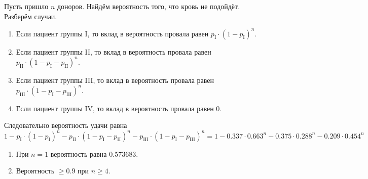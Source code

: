 \documentclass[12pt,a4paper]{article}
\begin{document}
    \begin{problem}{10}
        Пусть пришло $n$ доноров. Найдём вероятность того, что кровь не подойдёт. Разберём случаи.
        \begin{enumerate}
            \item Если пациент группы I, то вклад в вероятность провала равен $p_\mathrm{I} \cdot (1-p_\mathrm{I})^n$.
            \item Если пациент группы II, то вклад в вероятность провала равен $p_\mathrm{II} \cdot (1-p_\mathrm{I}-p_\mathrm{II})^n$.
            \item Если пациент группы III, то вклад в вероятность провала равен $p_\mathrm{III} \cdot (1-p_\mathrm{I}-p_\mathrm{III})^n$.
            \item Если пациент группы IV, то вклад в вероятность провала равен $0$.
        \end{enumerate}
        Следовательно вероятность удачи равна
        \[
            1 - p_\mathrm{I} \cdot (1-p_\mathrm{I})^n - p_\mathrm{II} \cdot (1-p_\mathrm{I}-p_\mathrm{II})^n - p_\mathrm{III} \cdot (1-p_\mathrm{I}-p_\mathrm{III})^n
            = 1 - 0.337 \cdot 0.663^n - 0.375 \cdot 0.288^n - 0.209 \cdot 0.454^n
        \]

        \begin{enumerate}\ItemedProblem
            \item При $n=1$ вероятность равна $0.573683$.
            \item Вероятность $\geqslant 0.9$ при $n \geqslant 4$.
        \end{enumerate}
    \end{problem}
\end{document}
